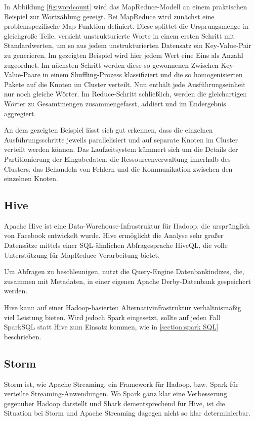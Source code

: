 In Abbildung \ref{fig:wordcount} wird das MapReduce-Modell an einem praktischen Beispiel zur Wortzählung gezeigt. Bei MapReduce wird zunächst eine problemspezifische Map-Funktion definiert. Diese splittet die Ursprungsmenge in gleichgroße Teile, versieht unstrukturierte Worte in einem ersten Schritt mit Standardwerten, um so aus jedem unstrukturierten Datensatz ein Key-Value-Pair zu generieren. Im gezeigten Beispiel wird hier jedem Wert eine Eins als Anzahl zugeordnet. Im nächsten Schritt werden diese so gewonnenen Zwischen-Key-Value-Paare in einem Shuffling-Prozess klassifiziert und die so homogenisierten Pakete auf die Knoten im Cluster verteilt. Nun enthält jede Ausführungseinheit nur noch gleiche Wörter. Im Reduce-Schritt schließlich, werden die gleichartigen Wörter zu Gesamtmengen zusammengefasst, addiert und im Endergebnis aggregiert. 

An dem gezeigten Beispiel lässt sich gut erkennen, dass die einzelnen Ausführungsschritte jeweils parallelisiert und auf separate Knoten im Cluster verteilt werden können. Das Laufzeitsystem kümmert sich um die Details der Partitionierung der Eingabedaten, die Ressourcenverwaltung innerhalb des Clusters, das Behandeln von Fehlern und die Kommunikation zwischen den einzelnen Knoten. 
 
\subsection{Hive}
\label{section:hive}


Apache Hive ist eine Data-Warehouse-Infrastruktur für Hadoop, die ursprünglich von Facebook entwickelt wurde. Hive ermöglicht die Analyse sehr großer Datensätze mittels einer SQL-ähnlichen Abfragesprache HiveQL, die volle Unterstützung für MapReduce-Verarbeitung bietet. 

Um Abfragen zu beschleunigen, nutzt die Query-Engine Datenbankindizes, die, zusammen mit Metadaten, in einer eigenen Apache Derby-Datenbank gespeichert werden.


Hive kann auf einer Hadoop-basierten Alternativinfrastruktur verhältnismäßig viel Leistung bieten. Wird jedoch Spark eingesetzt, sollte auf jeden Fall SparkSQL statt Hive zum Einsatz kommen, wie in \ref{section:spark SQL} beschrieben.

\subsection{Storm}
\label{section:storm}


Storm ist, wie Apache Streaming, ein Framework für Hadoop, bzw. Spark für verteilte Streaming-Anwendungen. Wo Spark ganz klar eine Verbesserung gegenüber Hadoop darstellt und Shark dementsprechend für Hive, ist die Situation bei Storm und Apache Streaming dagegen nicht so klar determinierbar. 

